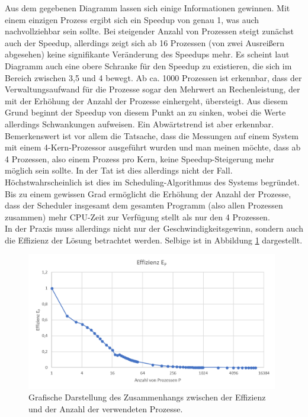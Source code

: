\begin{description}
						Aus dem gegebenen Diagramm lassen sich einige Informationen gewinnen. Mit einem einzigen Prozess ergibt sich ein Speedup von genau 1, was auch nachvollziehbar sein sollte. Bei steigender Anzahl von Prozessen steigt zunächst auch der Speedup, allerdings zeigt sich ab 16 Prozessen (von zwei Ausreißern abgesehen) keine signifikante Veränderung des Speedups mehr. Es scheint laut Diagramm auch eine obere Schranke für den Speedup zu existieren, die sich im Bereich zwischen 3,5 und 4 bewegt. Ab ca. 1000 Prozessen ist erkennbar, dass der Verwaltungsaufwand für die Prozesse sogar den Mehrwert an Rechenleistung, der mit der Erhöhung der Anzahl der Prozesse einhergeht, übersteigt. Aus diesem Grund beginnt der Speedup von diesem Punkt an zu sinken, wobei die Werte allerdings Schwankungen aufweisen. Ein Abwärtstrend ist aber erkennbar.\\
						Bemerkenswert ist vor allem die Tatsache, dass die Messungen auf einem System mit einem 4-Kern-Prozessor ausgeführt wurden und man meinen möchte, dass ab 4 Prozessen, also einem Prozess pro Kern, keine Speedup-Steigerung mehr möglich sein sollte. In der Tat ist dies allerdings nicht der Fall. Höchstwahrscheinlich ist dies im Scheduling-Algorithmus des Systems begründet. Bis zu einem gewissen Grad ermöglicht die Erhöhung der Anzahl der Prozesse, dass der Scheduler insgesamt dem gesamten Programm (also allen Prozessen zusammen) mehr CPU-Zeit zur Verfügung stellt als nur den 4 Prozessen.\\
						In der Praxis muss allerdings nicht nur der Geschwindigkeitsgewinn, sondern auch die Effizienz der Lösung betrachtet werden. Selbige ist in Abbildung \ref{fig:Effizienz_Prozesse} dargestellt.
						
						\begin{figure}
							\centering	
							\includegraphics[width=11cm]{Abbildungen/Effizienz_Prozesse.png}
							\caption{Grafische Darstellung des Zusammenhangs zwischen der Effizienz und der Anzahl der verwendeten Prozesse.}
							\label{fig:Effizienz_Prozesse}
						\end{figure}
						

\end{description}
